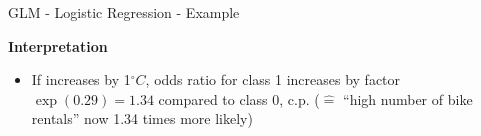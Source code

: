 \documentclass[11pt,compress,t,notes=noshow, aspectratio=169, xcolor=table]{beamer}
\begin{document}
\begin{frame}{GLM - Logistic Regression - Example}
\bigskip

\textbf{Interpretation}
\begin{itemize}
    \item If  increases by 1$^\circ C$, odds ratio for class 1 increases by factor $\exp (0.29) = 1.34$ compared to class 0, c.p. ($\hat =$ ``high number of bike rentals'' now 1.34 times more likely)
\end{itemize}
\end{frame}


\endlecture
\end{document}
